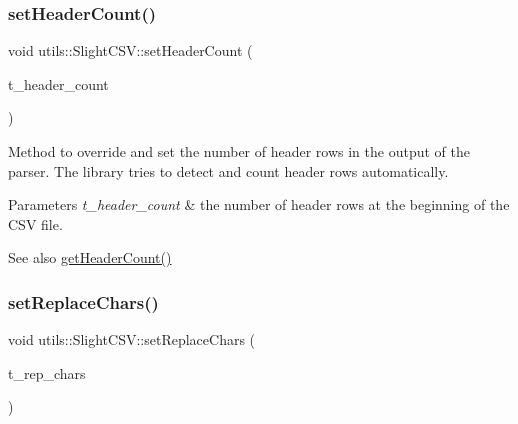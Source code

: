 \subsubsection{\texorpdfstring{set\+Header\+Count()}{setHeaderCount()}}
{\footnotesize\ttfamily void utils\+::\+Slight\+C\+S\+V\+::set\+Header\+Count (\begin{DoxyParamCaption}\item[{size\+\_\+t}]{t\+\_\+header\+\_\+count }\end{DoxyParamCaption})}

Method to override and set the number of header rows in the output of the parser. The library tries to detect and count header rows automatically. 
\begin{DoxyParams}{Parameters}
{\em t\+\_\+header\+\_\+count} & the number of header rows at the beginning of the C\+SV file. \\
\hline
\end{DoxyParams}
\begin{DoxySeeAlso}{See also}
\hyperlink{classutils_1_1SlightCSV_a781ae99927f2b8d704add6a2a53e0051}{get\+Header\+Count()} 
\end{DoxySeeAlso}
\mbox{\label{classutils_1_1SlightCSV_a9f7c4e3d88da03440d01b926b1fc3447}} 
\subsubsection{\texorpdfstring{set\+Replace\+Chars()}{setReplaceChars()}}
{\footnotesize\ttfamily void utils\+::\+Slight\+C\+S\+V\+::set\+Replace\+Chars (\begin{DoxyParamCaption}\item[{map$<$ char, char $>$ \&}]{t\+\_\+rep\+\_\+chars }\end{DoxyParamCaption})}

